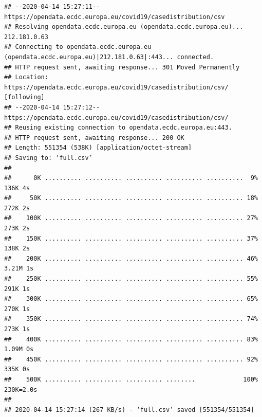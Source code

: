 \documentclass[]{article}
\newenvironment{Shaded}{\begin{snugshade}}{\end{snugshade}}
\newcommand{\CommentTok}[1]{\textcolor[rgb]{0.56,0.35,0.01}{\textit{#1}}}
\newcommand{\KeywordTok}[1]{\textcolor[rgb]{0.13,0.29,0.53}{\textbf{#1}}}
\newcommand{\NormalTok}[1]{#1}
\newcommand{\OperatorTok}[1]{\textcolor[rgb]{0.81,0.36,0.00}{\textbf{#1}}}
\newcommand{\StringTok}[1]{\textcolor[rgb]{0.31,0.60,0.02}{#1}}
\begin{document}
\begin{verbatim}
## --2020-04-14 15:27:11--  https://opendata.ecdc.europa.eu/covid19/casedistribution/csv
## Resolving opendata.ecdc.europa.eu (opendata.ecdc.europa.eu)... 212.181.0.63
## Connecting to opendata.ecdc.europa.eu (opendata.ecdc.europa.eu)|212.181.0.63|:443... connected.
## HTTP request sent, awaiting response... 301 Moved Permanently
## Location: https://opendata.ecdc.europa.eu/covid19/casedistribution/csv/ [following]
## --2020-04-14 15:27:12--  https://opendata.ecdc.europa.eu/covid19/casedistribution/csv/
## Reusing existing connection to opendata.ecdc.europa.eu:443.
## HTTP request sent, awaiting response... 200 OK
## Length: 551354 (538K) [application/octet-stream]
## Saving to: ‘full.csv’
## 
##      0K .......... .......... .......... .......... ..........  9%  136K 4s
##     50K .......... .......... .......... .......... .......... 18%  272K 2s
##    100K .......... .......... .......... .......... .......... 27%  273K 2s
##    150K .......... .......... .......... .......... .......... 37%  138K 2s
##    200K .......... .......... .......... .......... .......... 46% 3.21M 1s
##    250K .......... .......... .......... .......... .......... 55%  291K 1s
##    300K .......... .......... .......... .......... .......... 65%  270K 1s
##    350K .......... .......... .......... .......... .......... 74%  273K 1s
##    400K .......... .......... .......... .......... .......... 83% 1.09M 0s
##    450K .......... .......... .......... .......... .......... 92%  335K 0s
##    500K .......... .......... .......... ........             100%  230K=2.0s
## 
## 2020-04-14 15:27:14 (267 KB/s) - ‘full.csv’ saved [551354/551354]
\end{verbatim}

\begin{Shaded}
\end{Shaded}
\end{document}
